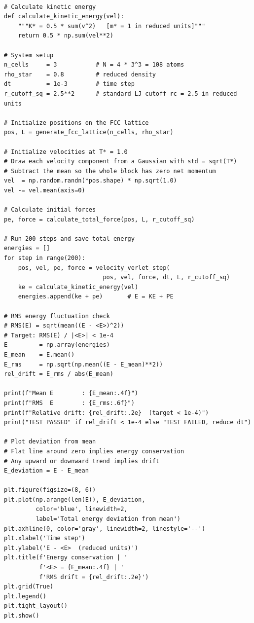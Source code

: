 \begin{lstlisting}

# Calculate kinetic energy
def calculate_kinetic_energy(vel):
    """K* = 0.5 * sum(v^2)   [m* = 1 in reduced units]"""
    return 0.5 * np.sum(vel**2)

# System setup
n_cells     = 3           # N = 4 * 3^3 = 108 atoms
rho_star    = 0.8         # reduced density
dt          = 1e-3        # time step
r_cutoff_sq = 2.5**2      # standard LJ cutoff rc = 2.5 in reduced units

# Initialize positions on the FCC lattice
pos, L = generate_fcc_lattice(n_cells, rho_star)

# Initialize velocities at T* = 1.0
# Draw each velocity component from a Gaussian with std = sqrt(T*)
# Subtract the mean so the whole block has zero net momentum
vel  = np.random.randn(*pos.shape) * np.sqrt(1.0)
vel -= vel.mean(axis=0)

# Calculate initial forces
pe, force = calculate_total_force(pos, L, r_cutoff_sq)

# Run 200 steps and save total energy
energies = []
for step in range(200):
    pos, vel, pe, force = velocity_verlet_step(
                            pos, vel, force, dt, L, r_cutoff_sq)
    ke = calculate_kinetic_energy(vel)
    energies.append(ke + pe)       # E = KE + PE

# RMS energy fluctuation check
# RMS(E) = sqrt(mean((E - <E>)^2))
# Target: RMS(E) / |<E>| < 1e-4
E         = np.array(energies)
E_mean    = E.mean()
E_rms     = np.sqrt(np.mean((E - E_mean)**2))
rel_drift = E_rms / abs(E_mean)

print(f"Mean E        : {E_mean:.4f}")
print(f"RMS  E        : {E_rms:.6f}")
print(f"Relative drift: {rel_drift:.2e}  (target < 1e-4)")
print("TEST PASSED" if rel_drift < 1e-4 else "TEST FAILED, reduce dt")

# Plot deviation from mean
# Flat line around zero implies energy conservation
# Any upward or downward trend implies drift
E_deviation = E - E_mean

plt.figure(figsize=(8, 6))
plt.plot(np.arange(len(E)), E_deviation,
         color='blue', linewidth=2,
         label='Total energy deviation from mean')
plt.axhline(0, color='gray', linewidth=2, linestyle='--')
plt.xlabel('Time step')
plt.ylabel('E - <E>  (reduced units)')
plt.title(f'Energy conservation | '
          f'<E> = {E_mean:.4f} | '
          f'RMS drift = {rel_drift:.2e}')
plt.grid(True)
plt.legend()
plt.tight_layout()
plt.show()

\end{lstlisting}


